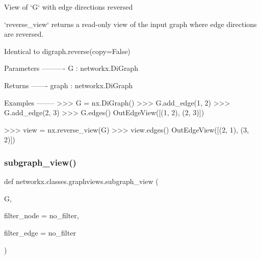 \begin{DoxyVerb}View of `G` with edge directions reversed

`reverse_view` returns a read-only view of the input graph where
edge directions are reversed.

Identical to digraph.reverse(copy=False)

Parameters
----------
G : networkx.DiGraph

Returns
-------
graph : networkx.DiGraph

Examples
--------
>>> G = nx.DiGraph()
>>> G.add_edge(1, 2)
>>> G.add_edge(2, 3)
>>> G.edges()
OutEdgeView([(1, 2), (2, 3)])

>>> view = nx.reverse_view(G)
>>> view.edges()
OutEdgeView([(2, 1), (3, 2)])
\end{DoxyVerb}
 \mbox{\label{namespacenetworkx_1_1classes_1_1graphviews_a33dcd3d967dd7ca14ad2bb823e4e831b}} 
\subsubsection{\texorpdfstring{subgraph\+\_\+view()}{subgraph\_view()}}
{\footnotesize\ttfamily def networkx.\+classes.\+graphviews.\+subgraph\+\_\+view (\begin{DoxyParamCaption}\item[{}]{G,  }\item[{}]{filter\+\_\+node = {\ttfamily no\+\_\+filter},  }\item[{}]{filter\+\_\+edge = {\ttfamily no\+\_\+filter} }\end{DoxyParamCaption})}

